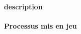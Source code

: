 \paragraph{description} %
\label{par:description_whitefly}


\paragraph{Processus mis en jeu} %
\label{par:process_whitefly}

